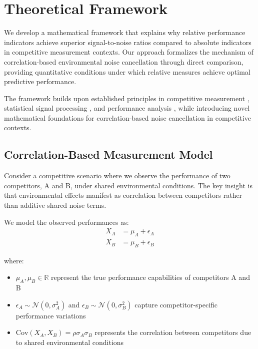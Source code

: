 \section{Theoretical Framework}

We develop a mathematical framework that explains why relative performance indicators achieve superior signal-to-noise ratios compared to absolute indicators in competitive measurement contexts. Our approach formalizes the mechanism of correlation-based environmental noise cancellation through direct comparison, providing quantitative conditions under which relative measures achieve optimal predictive performance.

The framework builds upon established principles in competitive measurement \cite{keiningham2015competitive}, statistical signal processing \cite{boll1979suppression}, and performance analysis \cite{hughes2002performance}, while introducing novel mathematical foundations for correlation-based noise cancellation in competitive contexts.

\subsection{Correlation-Based Measurement Model}

Consider a competitive scenario where we observe the performance of two competitors, A and B, under shared environmental conditions. The key insight is that environmental effects manifest as correlation between competitors rather than additive shared noise terms.

We model the observed performances as:
\begin{align}
X_A &= \mu_A + \epsilon_A \label{eq:model_a_corr} \\
X_B &= \mu_B + \epsilon_B \label{eq:model_b_corr}
\end{align}

where:
\begin{itemize}
    \item $\mu_A, \mu_B \in \mathbb{R}$ represent the true performance capabilities of competitors A and B
    \item $\epsilon_A \sim \mathcal{N}(0, \sigma_A^2)$ and $\epsilon_B \sim \mathcal{N}(0, \sigma_B^2)$ capture competitor-specific performance variations
    \item $\text{Cov}(X_A, X_B) = \rho\sigma_A\sigma_B$ represents the correlation between competitors due to shared environmental conditions
\end{itemize}

